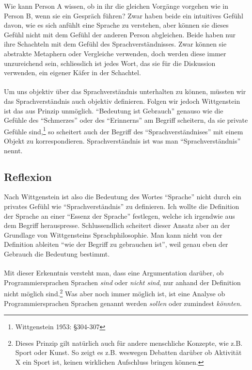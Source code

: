 \documentclass[10pt,a4paper]{article}
\begin{document}
Wie kann Person A wissen, ob in ihr die gleichen Vorgänge vorgehen wie in Person B, wenn sie ein Gespräch führen? 
Zwar haben beide ein intuitives Gefühl davon, wie es sich anfühlt eine Sprache zu verstehen, aber können sie dieses Gefühl nicht mit dem Gefühl der anderen Person abgleichen. Beide haben nur ihre Schachteln mit dem Gefühl des Sprachverständnisses. Zwar können sie abstrakte Metaphern oder Vergleiche verwenden, doch werden diese immer unzureichend sein, schliesslich ist jedes Wort, das sie für die Diskussion verwenden, ein eigener Käfer in der Schachtel. \\ \\
Um uns objektiv über das Sprachverständnis unterhalten zu können, müssten wir das Sprachverständnis auch objektiv definieren. Folgen wir jedoch Wittgenstein ist das aus Prinzip unmöglich. \enquote{Bedeutung ist Gebrauch} genauso wie die Gefühle des \enquote{Schmerzes} oder des \enquote{Erinnerns} am Begriff scheitern, da sie private Gefühle sind,\footnote{Wittgenstein 1953: §304-307} so scheitert auch der Begriff des \enquote{Sprachverständnises} mit einem Objekt zu korrespondieren. Sprachverständnis ist was man \enquote{Sprachverständnis} nennt.


\subsection{Reflexion}
Nach Wittgenstein ist also die Bedeutung des Wortes \enquote{Sprache} nicht durch ein privates Gefühl wie \enquote{Sprachverständnis} zu definieren. Ich wollte die  Definition der Sprache an einer \enquote{Essenz der Sprache} festlegen, welche ich irgendwie aus dem Begriff herauspresse. Schlussendlich scheitert dieser Ansatz aber an der Grundlage von Wittgensteins Sprachphilosophie. Man kann nicht von der Definition ableiten \enquote{wie der Begriff zu gebrauchen ist}, weil genau eben der Gebrauch die Bedeutung bestimmt. \\
\\
Mit dieser Erkenntnis versteht man, dass eine Argumentation darüber, ob Programmiersprachen Sprachen \textit{sind} oder \textit{nicht sind}, nur anhand der Definition nicht möglich sind.\footnote{Dieses Prinzip gilt natürlich auch für andere menschliche Konzepte, wie z.B. Sport oder Kunst. So zeigt es z.B. weswegen Debatten darüber ob Aktivität X ein Sport ist, keinen wirklichen Aufschluss bringen können.} Was aber noch immer möglich ist, ist eine Analyse ob Programmiersprachen Sprachen genannt werden \textit{sollen} oder zumindest \textit{könnten}.
\end{document}

